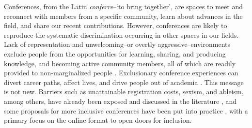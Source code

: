 \documentclass[10pt,letterpaper]{article}
\begin{document}
Conferences, from the Latin \textit{conferre}--`to bring together', are spaces to meet and reconnect with members from a specific community, learn about advances in the field, and share our recent contributions.
However, conferences are likely to reproduce the systematic discrimination occurring in other spaces in our fields. 
Lack of representation and unwelcoming--or overtly aggressive--environments exclude people from the opportunities for learning, sharing, and producing knowledge, and becoming active community members, all of which are readily provided to non-marginalized people \cite{hendersonThoughtfulGatheringsGendering2020}.
Exclusionary conference experiences can divert career paths, affect lives, and drive people out of academia \cite{biggsAcademicConferenceChilly2018, hendersonThoughtfulGatheringsGendering2020}. 
This message is not new. 
Barriers such as unattainable registration costs, sexism, and ableism, among others, have already been exposed and discussed in the literature \cite{arendDisparityConferenceRegistration2019, biggsAcademicConferenceChilly2018, depickerRethinkingInclusionDisability2020a, irishIncreasingParticipationUsing2020}, 
and some proposals for more inclusive conferences have been put into practice \cite{gichoraTenSimpleRules2010a, levitisCenteringInclusivityDesign2021, atkinsonJournalMedicine20202021, foramittiVirtuesVirtualConferences2021, ninerBetterWhomLeveling2021, rabyMovingAcademicConferences2021}, with a primary focus on the online format to open doors for inclusion. %
\end{document}
